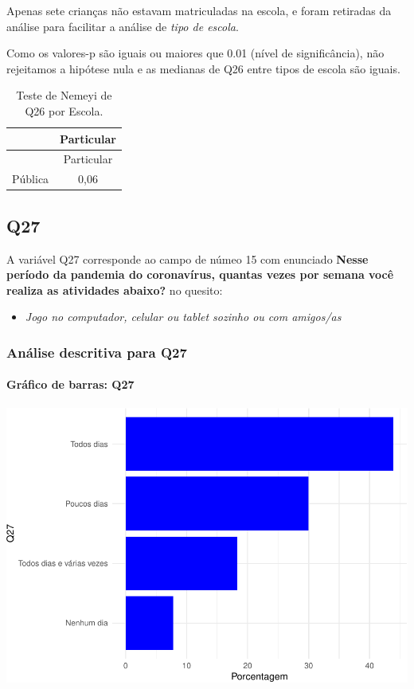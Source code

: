 \documentclass[]{article}
\providecommand{\tightlist}{%
  \setlength{\itemsep}{0pt}\setlength{\parskip}{0pt}}
\let\oldparagraph\paragraph
\renewcommand{\paragraph}[1]{\oldparagraph{#1}\mbox{}}
\begin{document}
Apenas sete crianças não estavam matriculadas na escola, e foram retiradas da análise para facilitar a análise de \emph{tipo de escola}.

Como os valores-p são iguais ou maiores que 0.01 (nível de significância), não rejeitamos a hipótese nula e as medianas de Q26 entre tipos de escola são iguais.

\begin{longtable}[]{@{}lc@{}}
\caption{\label{tab:unnamed-chunk-769}Teste de Nemeyi de Q26 por Escola.}\tabularnewline
\toprule
& Particular\tabularnewline
\midrule
\endfirsthead
\toprule
& Particular\tabularnewline
\midrule
\endhead
Pública & 0,06\tabularnewline
\bottomrule
\end{longtable}

\cleardoublepage

\hypertarget{q27}{%
\subsection{Q27}\label{q27}}

A variável Q27 corresponde ao campo de númeo 15 com enunciado \textbf{Nesse período da pandemia do coronavírus, quantas vezes por semana você realiza as atividades abaixo?} no quesito:

\begin{itemize}
\tightlist
\item
  \emph{Jogo no computador, celular ou tablet sozinho ou com amigos/as}
\end{itemize}

\hypertarget{anuxe1lise-descritiva-para-q27}{%
\subsubsection{Análise descritiva para Q27}\label{anuxe1lise-descritiva-para-q27}}

\hypertarget{gruxe1fico-de-barras-q27}{%
\paragraph{Gráfico de barras: Q27}\label{gruxe1fico-de-barras-q27}}

\begin{center}\includegraphics[width=0.75\linewidth]{relatorio_covid19_files/figure-latex/unnamed-chunk-776-1} \end{center}
\end{document}
